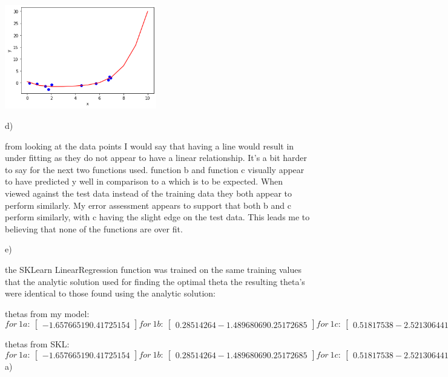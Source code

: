 \documentclass{homework}
\begin{document}
\centering
\includegraphics[width=250]{1c.png}

\caption{figure 2: using a similar method as 1a) but increasing the amount of features by 4}

\raggedright
d)

from looking at the data points I would say that having a line would result in under fitting as they do not appear to have a linear relationship. It's a bit harder to say for the next two functions used. function b and function c visually appear to have predicted y well in comparison to a which is to be expected. When viewed against the test data instead of the training data they both appear to perform similarly. My error assessment appears to support that both b and c perform similarly, with c having the slight edge on the test data. This leads me to believing that none of the functions are over fit.

e)

the SKLearn LinearRegression function was trained on the same training values that the analytic solution used for finding the optimal theta the resulting theta's were identical to those found using the analytic solution:

thetas from my model:
\[


for\ 1a:\
\begin{bmatrix}
 -1.65766519  0.41725154 
\end{bmatrix}


for\ 1b:\
\begin{bmatrix}
 0.28514264 -1.48968069  0.25172685 
\end{bmatrix}


for\ 1c:\
\begin{bmatrix}
 0.51817538 -2.52130644  1.07886107 -0.19978244  0.01466235
\end{bmatrix}
\]

thetas from SKL:
\[


for\ 1a:\
\begin{bmatrix}
 -1.65766519  0.41725154 
\end{bmatrix}


for\ 1b:\
\begin{bmatrix}
 0.28514264 -1.48968069  0.25172685 
\end{bmatrix}


for\ 1c:\
\begin{bmatrix}
 0.51817538 -2.52130644  1.07886107 -0.19978244  0.01466235
\end{bmatrix}
\]
\exercise*
a)
\end{document}
